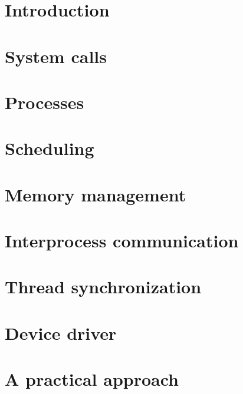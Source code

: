 \documentclass{acm_proc_article-sp}
\begin{document}
\section{Introduction}


%



\section{System calls}

\label{sec:system_calls}

\section{Processes}

\label{sec:processes}

\section{Scheduling}

\label{sec:scheduling}

\section{Memory management}

\label{sec:memory_managemet}

\section{Interprocess communication}

\label{sec:ipc}

\section{Thread synchronization}

\label{sec:thread_syncronization}

\section{Device driver}

\label{sec:device_driver}

\section{A practical approach}

\label{sec:practical}
\end{document}
